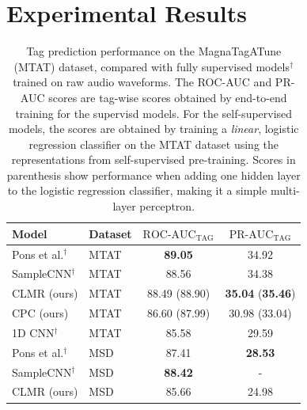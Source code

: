 \chapter{Experimental Results}\label{sec:results}
\begin{table}
    \centering
    \begin{tabular}{@{}llcc@{}}\toprule
        Model & Dataset & $\text{ROC-AUC}_\text{TAG}$ & $\text{PR-AUC}_\text{TAG}$ \\ \midrule
        Pons et al.$^\dagger$ & MTAT & \textbf{89.05} & 34.92 \\
        SampleCNN$^\dagger$ & MTAT & 88.56 & 34.38 \\
        CLMR (ours) & MTAT & 88.49 (88.90) & \textbf{35.04} (\textbf{35.46}) \\
        CPC (ours) & MTAT & 86.60 (87.99) & 30.98 (33.04) \\
        1D CNN$^\dagger$ & MTAT & 85.58 & 29.59 \\\midrule
        Pons et al.$^\dagger$ & MSD & 87.41 & \textbf{28.53} \\
        SampleCNN$^\dagger$ & MSD & \textbf{88.42} & - \\
        CLMR (ours) & MSD & 85.66 & 24.98 \\
        \bottomrule
    \end{tabular}
    \caption{Tag prediction performance on the MagnaTagATune (MTAT) dataset, compared with fully supervised models$^\dagger$ trained on raw audio waveforms.
The ROC-AUC and PR-AUC scores are tag-wise scores obtained by end-to-end training for the supervisd models.
For the self-supervised models, the scores are obtained by training a \emph{linear}, logistic regression classifier on the MTAT dataset using the representations from self-supervised pre-training.
Scores in parenthesis show performance when adding one hidden layer to the logistic regression classifier, making it a simple multi-layer perceptron.}
    \label{tab:magnatagatune_results}
\end{table}

